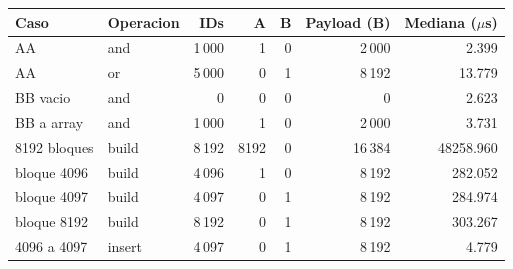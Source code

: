 \begin{tabular}{llrrrrr}
\toprule
Caso & Operacion & IDs & A & B & Payload (B) & Mediana ($\mu$s) \\
\midrule
AA & and & 1\,000 & 1 & 0 & 2\,000 & 2.399 \\
AA & or & 5\,000 & 0 & 1 & 8\,192 & 13.779 \\
BB vacio & and & 0 & 0 & 0 & 0 & 2.623 \\
BB a array & and & 1\,000 & 1 & 0 & 2\,000 & 3.731 \\
8192 bloques & build & 8\,192 & 8192 & 0 & 16\,384 & 48258.960 \\
bloque 4096 & build & 4\,096 & 1 & 0 & 8\,192 & 282.052 \\
bloque 4097 & build & 4\,097 & 0 & 1 & 8\,192 & 284.974 \\
bloque 8192 & build & 8\,192 & 0 & 1 & 8\,192 & 303.267 \\
4096 a 4097 & insert & 4\,097 & 0 & 1 & 8\,192 & 4.779 \\
\bottomrule
\end{tabular}
